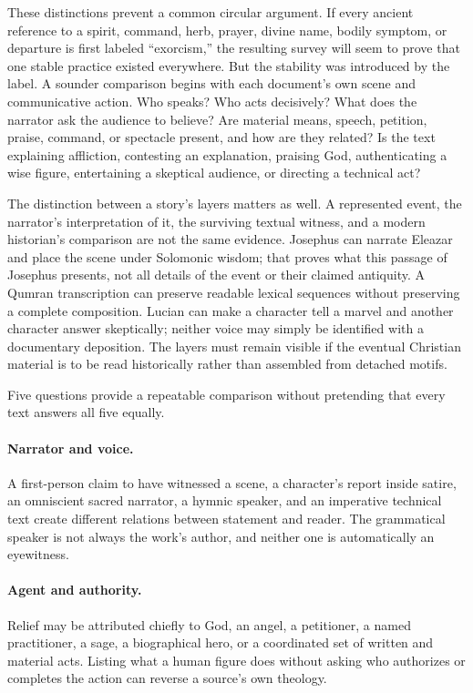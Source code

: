 These distinctions prevent a common circular argument. If every ancient
reference to a spirit, command, herb, prayer, divine name, bodily symptom, or
departure is first labeled ``exorcism,'' the resulting survey will seem to
prove that one stable practice existed everywhere. But the stability was
introduced by the label. A sounder comparison begins with each document's own
scene and communicative action. Who speaks? Who acts decisively? What does the
narrator ask the audience to believe? Are material means, speech, petition,
praise, command, or spectacle present, and how are they related? Is the text
explaining affliction, contesting an explanation, praising God, authenticating
a wise figure, entertaining a skeptical audience, or directing a technical
act?

The distinction between a story's layers matters as well. A represented event,
the narrator's interpretation of it, the surviving textual witness, and a
modern historian's comparison are not the same evidence. Josephus can narrate
Eleazar and place the scene under Solomonic wisdom; that proves what this
passage of Josephus presents, not all details of the event or their claimed
antiquity. A Qumran transcription can preserve readable lexical sequences
without preserving a complete composition. Lucian can make a character tell a
marvel and another character answer skeptically; neither voice may simply be
identified with a documentary deposition. The layers must remain visible if
the eventual Christian material is to be read historically rather than
assembled from detached motifs.

Five questions provide a repeatable comparison without pretending that every
text answers all five equally.

\paragraph{Narrator and voice.} A first-person claim to have witnessed a scene, a
character's report inside satire, an omniscient sacred narrator, a hymnic
speaker, and an imperative technical text create different relations between
statement and reader. The grammatical speaker is not always the work's author,
and neither one is automatically an eyewitness.

\paragraph{Agent and authority.} Relief may be attributed chiefly to God, an angel,
a petitioner, a named practitioner, a sage, a biographical hero, or a
coordinated set of written and material acts. Listing what a human figure does
without asking who authorizes or completes the action can reverse a source's
own theology.

